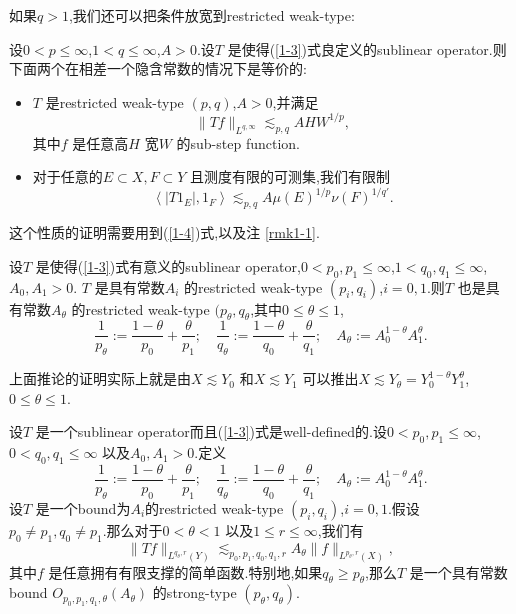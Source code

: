 如果$q>1$,我们还可以把条件放宽到restricted weak-type:
\begin{proposition}\label{prp1-1}
  设$0<p\le \infty$,$1<q\le \infty$,$A>0$.设$T$ 是使得(\ref{1-3})式良定义的sublinear operator.则下面两个在相差一个隐含常数的情况下是等价的:
  \begin{itemize}
    \item $T$ 是restricted weak-type $(p,q)$,$A>0$,并满足
       \begin{equation}
        \|Tf\|_{L^{q,\infty}}\lesssim_{p,q}AHW^{1 /p},
      \end{equation}
      其中$f$ 是任意高$H$ 宽$W$ 的sub-step function.
    \item 对于任意的$E\subset X,F\subset Y$ 且测度有限的可测集,我们有限制
      \[
	\left<|T 1_E|,1_F \right>\lesssim_{p,q}A\mu(E)^{1 /p}\nu(F)^{1 /q'}.
      \] 
    \end{itemize}
\end{proposition}
这个性质的证明需要用到(\ref{1-4})式,以及注 \ref{rmk1-1}.

\begin{corollary}
  设$T$ 是使得(\ref{1-3})式有意义的sublinear operator,$0<p_0,p_1\le \infty$,$1<q_0,q_1\le \infty$,$A_0,A_1>0$. $T$ 是具有常数$A_i$ 的restricted weak-type $(p_i,q_i)$,$i=0,1$.则$T$ 也是具有常数$A_\theta$ 的restricted weak-type $(p_\theta,q_\theta$,其中$0\le \theta\le 1$,
   \[
   \frac{1}{p_\theta}:=\frac{1-\theta}{p_0}+\frac{\theta}{p_1};\quad \frac{1}{q_\theta}:=\frac{1-\theta}{q_0}+\frac{\theta}{q_1};\quad A_\theta:=A_0^{1-\theta}A_1^{\theta}.
   \]  
\end{corollary}
上面推论的证明实际上就是由$X\lesssim Y_0$ 和$X\lesssim Y_1$ 可以推出$X\lesssim Y_\theta=Y_0^{1-\theta}Y_1^{\theta}$,$0\le \theta\le 1$.

\begin{theorem}
  设$T$ 是一个sublinear operator而且(\ref{1-3})式是well-defined的.设$0<p_0,p_1\le \infty$,$0<q_0,q_1\le \infty$ 以及$A_0,A_1>0$.定义
  \[
    \frac{1}{p_\theta}:=\frac{1-\theta}{p_0}+\frac{\theta}{p_1};\quad \frac{1}{q_\theta}:=\frac{1-\theta}{q_0}+\frac{\theta}{q_1};\quad A_\theta:=A_0^{1-\theta}A_1^{\theta}.
  \] 
  设$T$ 是一个bound为$A_i$的restricted weak-type $(p_i,q_i)$,$i=0,1$.假设 $p_0\neq p_1,q_0\neq p_1$.那么对于$0<\theta<1$ 以及$1\le r\le \infty$,我们有
  \[
    \|Tf\|_{L^{q_\theta,r}(Y)}\lesssim_{p_0,p_1,q_0,q_1,r} A_{\theta}\|f\|_{L^{p_\theta,r}(X)},
  \] 
  其中$f$ 是任意拥有有限支撑的简单函数.特别地,如果$q_\theta\ge p_\theta$,那么$T$ 是一个具有常数bound $O_{p_0,p_1,q_1,\theta}(A_\theta)$ 的strong-type $(p_\theta,q_\theta)$.
\end{theorem}

  

